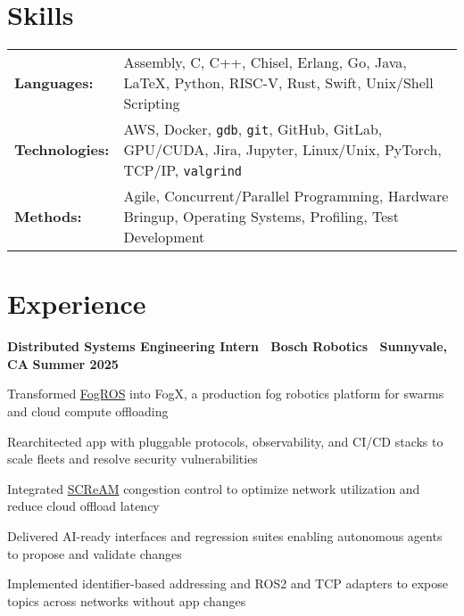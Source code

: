 \documentclass[10pt]{article}
\newenvironment{mylist}[1][]
{\itemize[nosep, wide=0pt, leftmargin=*, after=\strut]}
{\enditemize}
\begin{document}

\section{Skills}
\begin{tabularx}{\linewidth}{@{}l X@{}}
    \textbf{Languages:} & Assembly, C, C++, Chisel, Erlang, Go, Java, \LaTeX, Python, RISC-V, Rust, Swift, Unix/Shell Scripting \\
    \textbf{Technologies:} & AWS, Docker, \texttt{gdb}, \texttt{git}, GitHub, GitLab, GPU/CUDA, Jira, Jupyter, Linux/Unix, PyTorch, TCP/IP, \texttt{valgrind} \\
    \textbf{Methods:} & Agile, Concurrent/Parallel Programming, Hardware Bringup, Operating Systems, Profiling, Test Development
\end{tabularx}


\section{Experience}
\begin{minipage}[t]{\linewidth}
    \textbf{Distributed Systems Engineering Intern \textbar \ Bosch Robotics \textbar \ Sunnyvale, CA} \hfill \textbf{Summer 2025} 
    \begin{mylist}
        \item Transformed \href{https://github.com/BerkeleyAutomation/FogROS2}{FogROS} into FogX, a production fog robotics platform for swarms and cloud compute offloading
        \item Rearchitected app with pluggable protocols, observability, and CI/CD stacks to scale fleets and resolve security vulnerabilities
        \item Integrated \href{https://datatracker.ietf.org/doc/draft-johansson-ccwg-rfc8298bis-screamv2/}{SCReAM} congestion control to optimize network utilization and reduce cloud offload latency
        \item Delivered AI-ready interfaces and regression suites enabling autonomous agents to propose and validate changes
        \item Implemented identifier-based addressing and ROS2 and TCP adapters to expose topics across networks without app changes 
    \end{mylist}
\end{minipage}
\end{document}
